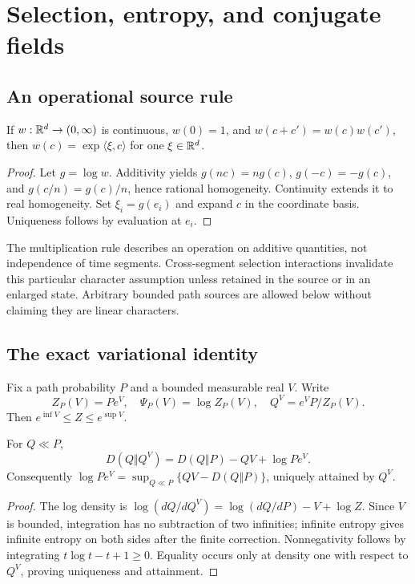 \section{Selection, entropy, and conjugate fields}\label{sec:selection}
\subsection{An operational source rule}
\begin{theorem}\label{thm:character}
If $w:\mathbb R^d\to(0,\infty)$ is continuous, $w(0)=1$, and
$w(c+c')=w(c)w(c')$, then $w(c)=\exp\langle\xi,c\rangle$ for one $\xi\in\mathbb R^d$.
\end{theorem}
\begin{proof}
Let $g=\log w$. Additivity yields $g(nc)=ng(c)$, $g(-c)=-g(c)$, and $g(c/n)=g(c)/n$, hence rational homogeneity. Continuity extends it to real homogeneity. Set $\xi_i=g(e_i)$ and expand $c$ in the coordinate basis. Uniqueness follows by evaluation at $e_i$.
\end{proof}

The multiplication rule describes an operation on additive quantities, not independence of time segments. Cross-segment selection interactions invalidate this particular character assumption unless retained in the source or in an enlarged state. Arbitrary bounded path sources are allowed below without claiming they are linear characters.

\subsection{The exact variational identity}
Fix a path probability $P$ and a bounded measurable real $V$. Write
\[
 Z_P(V)=Pe^V,\quad\Psi_P(V)=\log Z_P(V),\quad Q^V=e^VP/Z_P(V).
\]
Then $e^{\inf V}\le Z\le e^{\sup V}$.

\begin{theorem}\label{thm:gibbs}
For $Q\ll P$,
\begin{equation}
 D(Q\Vert Q^V)=D(Q\Vert P)-QV+\log Pe^V.
 \label{eq:gibbs-gap}
\end{equation}
Consequently
$\log Pe^V=\sup_{Q\ll P}\{QV-D(Q\Vert P)\}$, uniquely attained by $Q^V$.
\end{theorem}
\begin{proof}
The log density is $\log(dQ/dQ^V)=\log(dQ/dP)-V+\log Z$. Since $V$ is bounded, integration has no subtraction of two infinities; infinite entropy gives infinite entropy on both sides after the finite correction. Nonnegativity follows by integrating $t\log t-t+1\ge0$. Equality occurs only at density one with respect to $Q^V$, proving uniqueness and attainment.
\end{proof}

